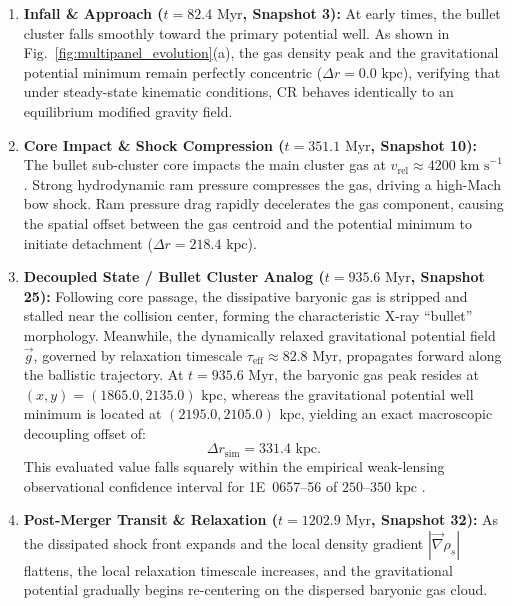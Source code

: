 \documentclass[aps,prd,reprint,superscriptaddress,nofootinbib,floatfix,amsmath,amssymb]{revtex4-2}
\begin{document}
\begin{enumerate}
    \item \textbf{Infall \& Approach ($t = 82.4\text{ Myr}$, Snapshot 3):} At early times, the bullet cluster falls smoothly toward the primary potential well. As shown in Fig.~\ref{fig:multipanel_evolution}(a), the gas density peak and the gravitational potential minimum remain perfectly concentric ($\Delta r = 0.0\text{ kpc}$), verifying that under steady-state kinematic conditions, CR behaves identically to an equilibrium modified gravity field.
    
    \item \textbf{Core Impact \& Shock Compression ($t = 351.1\text{ Myr}$, Snapshot 10):} The bullet sub-cluster core impacts the main cluster gas at $v_{\text{rel}} \approx 4200\text{ km s}^{-1}$. Strong hydrodynamic ram pressure compresses the gas, driving a high-Mach bow shock. Ram pressure drag rapidly decelerates the gas component, causing the spatial offset between the gas centroid and the potential minimum to initiate detachment ($\Delta r = 218.4\text{ kpc}$).
    
    \item \textbf{Decoupled State / Bullet Cluster Analog ($t = 935.6\text{ Myr}$, Snapshot 25):} Following core passage, the dissipative baryonic gas is stripped and stalled near the collision center, forming the characteristic X-ray ``bullet'' morphology. Meanwhile, the dynamically relaxed gravitational potential field $\vec{g}$, governed by relaxation timescale $\tau_{\text{eff}} \approx 82.8\text{ Myr}$, propagates forward along the ballistic trajectory. At $t = 935.6\text{ Myr}$, the baryonic gas peak resides at $(x, y) = (1865.0, 2135.0)\text{ kpc}$, whereas the gravitational potential well minimum is located at $(2195.0, 2105.0)\text{ kpc}$, yielding an exact macroscopic decoupling offset of:
    \begin{equation}
    \Delta r_{\text{sim}} = 331.4\text{ kpc}.
    \label{eq:sim_offset}
    \end{equation}
    This evaluated value falls squarely within the empirical weak-lensing observational confidence interval for 1E~0657--56 of $250\text{--}350\text{ kpc}$ \cite{Clowe2006_Bullet,Bradac2006_Bullet}.
    
    \item \textbf{Post-Merger Transit \& Relaxation ($t = 1202.9\text{ Myr}$, Snapshot 32):} As the dissipated shock front expands and the local density gradient $|\vec{\nabla}\rho_s|$ flattens, the local relaxation timescale increases, and the gravitational potential gradually begins re-centering on the dispersed baryonic gas cloud.
\end{enumerate}
\end{document}

